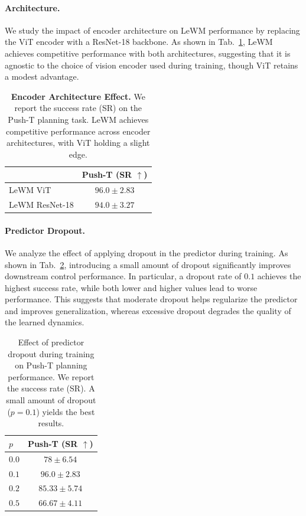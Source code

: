 \paragraph{Architecture.}
We study the impact of encoder architecture on LeWM performance by replacing the ViT encoder with a ResNet-18 backbone. As shown in Tab.~\ref{tab:encoder-arch}, LeWM achieves competitive performance with both architectures, suggesting that it is agnostic to the choice of vision encoder used during training, though ViT retains a modest advantage.

\begin{table}[h]
\centering
\caption{\small \textbf{Encoder Architecture Effect.} We report the success rate (SR) on the Push-T planning task. LeWM achieves competitive performance across encoder architectures, with ViT holding a slight edge.}
\begin{tabular}{l c}
\toprule
 & \textbf{Push-T} (SR $\uparrow$)\\
\midrule
LeWM ViT & $\bm{96.0} \pm \bm{2.83}$\\
LeWM ResNet-18 & $94.0 \pm 3.27$\\
\bottomrule
\end{tabular}
\label{tab:encoder-arch}
\end{table}

\paragraph{Predictor Dropout.}
We analyze the effect of applying dropout in the predictor during training. As shown in Tab.~\ref{tab:pred-drop}, introducing a small amount of dropout significantly improves downstream control performance. In particular, a dropout rate of $0.1$ achieves the highest success rate, while both lower and higher values lead to worse performance. This suggests that moderate dropout helps regularize the predictor and improves generalization, whereas excessive dropout degrades the quality of the learned dynamics.

\begin{table}
\centering
\caption{\small Effect of predictor dropout during training on Push-T planning performance. We report the success rate (SR). A small amount of dropout ($p=0.1$) yields the best results.}
\begin{tabular}{l c}
\toprule
$p$ & \textbf{Push-T} (SR $\uparrow$)\\
\toprule
$0.0$ & $78 \pm 6.54$\\
$0.1$ & $\bm{96.0} \pm \bm{2.83}$\\
$0.2$ & $85.33 \pm 5.74$\\
$0.5$ & $66.67 \pm 4.11$\\
\bottomrule
\end{tabular}
\label{tab:pred-drop}
\end{table}

